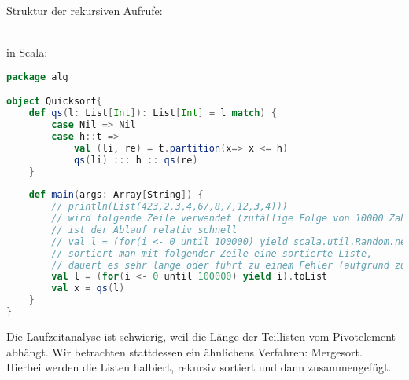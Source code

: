Struktur der rekursiven Aufrufe:\smallskip\\
\\
in Scala:
\begin{lstlisting}[language=scala]
package alg

object Quicksort{
	def qs(l: List[Int]): List[Int] = l match) {
		case Nil => Nil
		case h::t =>
			val (li, re) = t.partition(x=> x <= h)
			qs(li) ::: h :: qs(re)
	}
	
	def main(args: Array[String]) {
		// println(List(423,2,3,4,67,8,7,12,3,4)))
		// wird folgende Zeile verwendet (zufällige Folge von 10000 Zahlen), 
		// ist der Ablauf relativ schnell
		// val l = (for(i <- 0 until 100000) yield scala.util.Random.nextInt).toList
		// sortiert man mit folgender Zeile eine sortierte Liste, 
		// dauert es sehr lange oder führt zu einem Fehler (aufgrund zu vieler Rekursionen)
		val l = (for(i <- 0 until 100000) yield i).toList
		val x = qs(l)
	}
}
\end{lstlisting}
Die Laufzeitanalyse ist schwierig, weil die Länge der Teillisten vom Pivotelement abhängt. Wir betrachten stattdessen ein ähnlichens Verfahren: Mergesort.\\
Hierbei werden die Listen halbiert, rekursiv sortiert und dann zusammengefügt.

